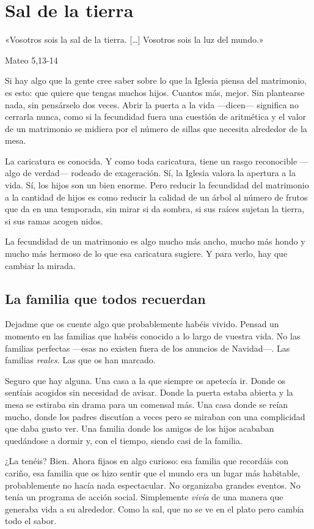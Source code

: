 \chapter{Sal de la tierra}

\epigraph{«Vosotros sois la sal de la tierra. [\ldots] Vosotros sois la luz del mundo.»}{Mateo 5,13-14}

Si hay algo que la gente cree saber sobre lo que la Iglesia piensa del matrimonio, es esto: que quiere que tengas muchos hijos. Cuantos más, mejor. Sin plantearse nada, sin pensárselo dos veces. Abrir la puerta a la vida ---dicen--- significa no cerrarla nunca, como si la fecundidad fuera una cuestión de aritmética y el valor de un matrimonio se midiera por el número de sillas que necesita alrededor de la mesa.

La caricatura es conocida. Y como toda caricatura, tiene un rasgo reconocible ---algo de verdad--- rodeado de exageración. Sí, la Iglesia valora la apertura a la vida. Sí, los hijos son un bien enorme. Pero reducir la fecundidad del matrimonio a la cantidad de hijos es como reducir la calidad de un árbol al número de frutos que da en una temporada, sin mirar si da sombra, si sus raíces sujetan la tierra, si sus ramas acogen nidos.

La fecundidad de un matrimonio es algo mucho más ancho, mucho más hondo y mucho más hermoso de lo que esa caricatura sugiere. Y para verlo, hay que cambiar la mirada.

\section{La familia que todos recuerdan}

Dejadme que os cuente algo que probablemente habéis vivido. Pensad un momento en las familias que habéis conocido a lo largo de vuestra vida. No las familias perfectas ---esas no existen fuera de los anuncios de Navidad---. Las familias \emph{reales}. Las que os han marcado.

Seguro que hay alguna. Una casa a la que siempre os apetecía ir. Donde os sentíais acogidos sin necesidad de avisar. Donde la puerta estaba abierta y la mesa se estiraba sin drama para un comensal más. Una casa donde se reían mucho, donde los padres discutían a veces pero se miraban con una complicidad que daba gusto ver. Una familia donde los amigos de los hijos acababan quedándose a dormir y, con el tiempo, siendo casi de la familia.

¿La tenéis? Bien. Ahora fijaos en algo curioso: esa familia que recordáis con cariño, esa familia que os hizo sentir que el mundo era un lugar más habitable, probablemente no hacía nada espectacular. No organizaba grandes eventos. No tenía un programa de acción social. Simplemente \emph{vivía} de una manera que generaba vida a su alrededor. Como la sal, que no se ve en el plato pero cambia todo el sabor.


